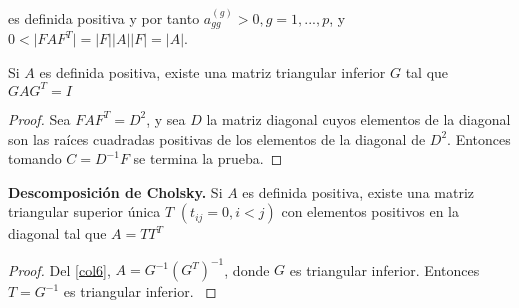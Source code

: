 es definida positiva y por tanto $a_{gg}^{(g)}>0, g=1,...,p$, y $0 < \vert FAF^T \vert = \vert F \vert \vert A \vert \vert F \vert = \vert A \vert$.
\begin{corolario}\label{col6}
Si $A$ es definida positiva, existe una matriz triangular inferior $G$ tal que $GAG^T=I$
\end{corolario}
\begin{proof}
Sea $FAF^T=D^2$, y sea $D$ la matriz diagonal cuyos elementos de la diagonal son las raíces cuadradas positivas de los elementos de la diagonal de $D^2$. Entonces tomando $C=D^{-1}F$ se termina la prueba.
\end{proof}
\begin{corolario}
\textbf{Descomposición de Cholsky.} Si $A$ es definida positiva, existe una matriz triangular superior única $T$ $(t_{ij}=0, i<j)$ con elementos positivos en la diagonal tal que $A=TT^T$
\end{corolario}
\begin{proof}
Del \autoref{col6}, $A=G^{-1}(G^{T})^{-1}$, donde $G$ es triangular inferior. Entonces $T=G^{-1}$ es triangular inferior. \cite{anderson1958introduction}
\end{proof}
